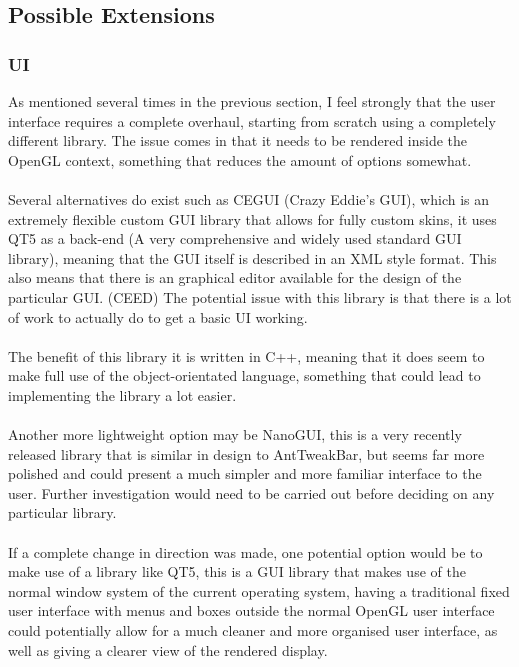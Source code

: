 \subsection{Possible Extensions}
\subsubsection{UI}
As mentioned several times in the previous section, I feel strongly that the user interface requires a complete overhaul, starting from scratch using a completely different library. The issue comes in that it needs to be rendered inside the OpenGL context, something that reduces the amount of options somewhat.

\paragraph{}
Several alternatives do exist such as CEGUI (Crazy Eddie's GUI), which is an extremely flexible custom GUI library that allows for fully custom skins, it uses QT5 as a back-end (A very comprehensive and widely used standard GUI library), meaning that the GUI itself is described in an XML style format.
This also means that there is an graphical editor available for the design of the particular GUI. (CEED) The potential issue with this library is that there is a lot of work to actually do to get a basic UI working.

\paragraph{}
The benefit of this library it is written in C++, meaning that it does seem to make full use of the object-orientated language, something that could lead to implementing the library a lot easier.

\paragraph{}
Another more lightweight option may be NanoGUI, this is a very recently released library that is similar in design to AntTweakBar, but seems far more polished and could present a much simpler and more familiar interface to the user. Further investigation would need to be carried out before deciding on any particular library.

\paragraph{}
If a complete change in direction was made, one potential option would be to make use of a library like QT5, this is a GUI library that makes use of the normal window system of the current operating system, having a traditional fixed user interface with menus and boxes outside the normal OpenGL user interface could potentially allow for a much cleaner and more organised user interface, as well as giving a clearer view of the rendered display.

